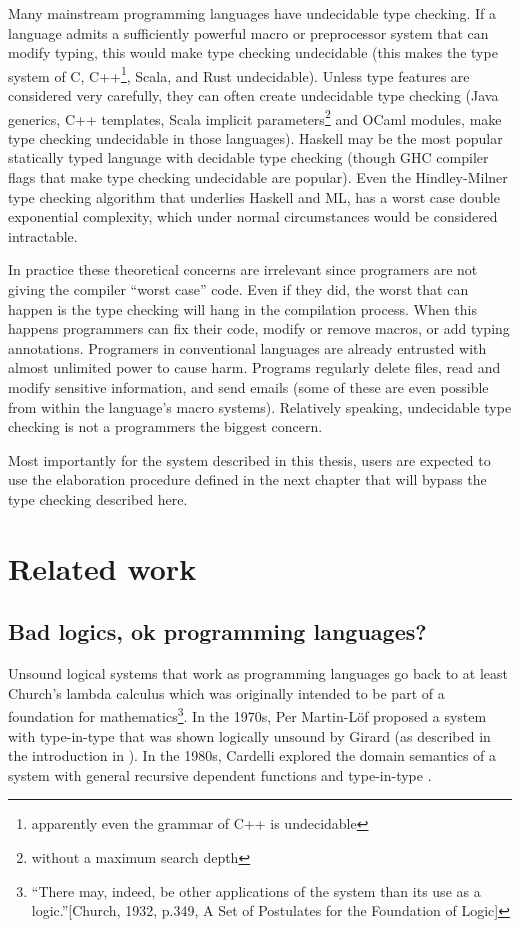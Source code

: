Many mainstream programming languages have undecidable type checking.
If a language admits a sufficiently powerful macro or preprocessor
system that can modify typing, this would make type checking undecidable
(this makes the type system of C, C++\footnote{apparently even the grammar of C++ is undecidable},
Scala, and Rust undecidable). Unless type features are considered
very carefully, they can often create undecidable type checking (Java
generics, C++ templates, Scala implicit parameters\footnote{without a maximum search depth}
and OCaml modules, make type checking undecidable in those languages).
Haskell may be the most popular statically typed language with decidable
type checking (though GHC compiler flags that make type checking undecidable
are popular). Even the Hindley-Milner type checking algorithm that
underlies Haskell and ML, has a worst case double exponential complexity,
which under normal circumstances would be considered intractable.

In practice these theoretical concerns are irrelevant since programers
are not giving the compiler ``worst case'' code. Even if they did,
the worst that can happen is the type checking will hang in the compilation
process. When this happens programmers can fix their code, modify
or remove macros, or add typing annotations. Programers in conventional
languages are already entrusted with almost unlimited power to cause
harm. Programs regularly delete files, read and modify sensitive information,
and send emails (some of these are even possible from within the language's
macro systems). Relatively speaking, undecidable type checking is
not a programmers the biggest concern.

Most importantly for the system described in this thesis, users are
expected to use the elaboration procedure defined in the next chapter
that will bypass the type checking described here. %

\section{Related work}

\subsection{Bad logics, ok programming languages?}

Unsound logical systems that work as programming languages go back
to at least Church's lambda calculus which was originally intended
to be part of a foundation for mathematics\footnote{``There may, indeed, be other applications of the system than its
use as a logic.''{[}Church, 1932, p.349, A Set of Postulates for
the Foundation of Logic{]}}. In the 1970s, Per Martin-L{\"o}f proposed a system with type-in-type
that was shown logically unsound by Girard (as described in the introduction
in \cite{Martin-Lof-1972}). In the 1980s, Cardelli explored the domain
semantics of a system with general recursive dependent functions and
type-in-type \cite{cardelli1986polymorphic}. 

